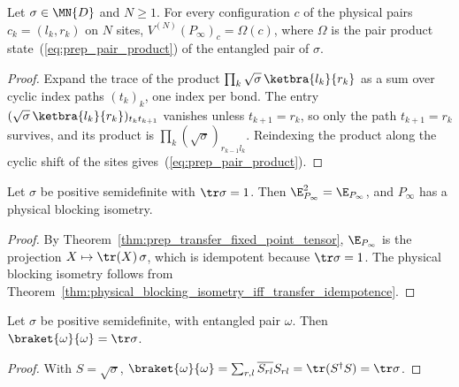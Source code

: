 \begin{theorem}
    \label{thm:prep_mpv_fixed_point_tensor}
    \leanok
    Let $\sigma\in\MN{D}$ and $N\ge1$. For every configuration $c$ of the
    physical pairs $c_k=(l_k,r_k)$ on $N$ sites,
    $V^{(N)}(P_\infty)_c=\Omega(c)$, where $\Omega$ is the pair product
    state~(\ref{eq:prep_pair_product}) of the entangled pair of $\sigma$.
\end{theorem}
\begin{proof}
    \leanok
    Expand the trace of the product
    $\prod_k\sqrt\sigma\,\ketbra{l_k}{r_k}$ as a sum over cyclic index
    paths $(t_k)_k$, one index per bond. The entry
    $(\sqrt\sigma\,\ketbra{l_k}{r_k})_{t_k t_{k+1}}$ vanishes unless
    $t_{k+1}=r_k$, so only the path $t_{k+1}=r_k$ survives, and its
    product is $\prod_k(\sqrt\sigma)_{r_{k-1}l_k}$. Reindexing the product
    along the cyclic shift of the sites gives~(\ref{eq:prep_pair_product}).
\end{proof}

\begin{theorem}
    \label{thm:prep_fixed_point_tensor_rfp}
    \leanok
    Let $\sigma$ be positive semidefinite with $\tr\sigma=1$. Then
    $\E_{P_\infty}^2=\E_{P_\infty}$, and $P_\infty$ has a physical blocking
    isometry.
\end{theorem}
\begin{proof}
    \leanok
    By Theorem~\ref{thm:prep_transfer_fixed_point_tensor},
    $\E_{P_\infty}$ is the projection $X\mapsto\tr(X)\,\sigma$, which is
    idempotent because $\tr\sigma=1$. The physical blocking isometry
    follows from
    Theorem~\ref{thm:physical_blocking_isometry_iff_transfer_idempotence}.
\end{proof}

\begin{theorem}
    \label{thm:prep_pair_norm}
    \leanok
    Let $\sigma$ be positive semidefinite, with entangled pair $\omega$.
    Then $\braket{\omega}{\omega}=\tr\sigma$.
\end{theorem}
\begin{proof}
    \leanok
    With $S=\sqrt\sigma$,
    $\braket{\omega}{\omega}=\sum_{r,l}\overline{S_{rl}}S_{rl}=\tr(S^\dagger S)=\tr\sigma$.
\end{proof}

